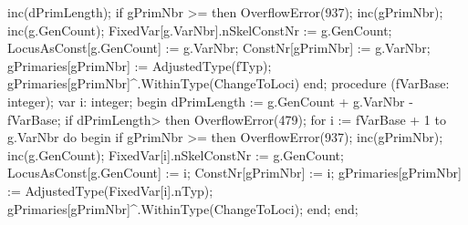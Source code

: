    inc(dPrimLength);
   if gPrimNbr >=  then OverflowError(937);
   inc(gPrimNbr);
   inc(g.GenCount);
   FixedVar[g.VarNbr].nSkelConstNr := g.GenCount;
   LocusAsConst[g.GenCount] := g.VarNbr;
   ConstNr[gPrimNbr] := g.VarNbr;
   gPrimaries[gPrimNbr] := AdjustedType(fTyp);
   gPrimaries[gPrimNbr]^.WithinType(ChangeToLoci)
end;
\eatline
{}\nwendcode{}\nwdocspar
\nwenddocs{}\endmoddef\nwstartdeflinemarkup{}\nwenddeflinemarkup
procedure (fVarBase: integer);
var
   i: integer;
begin
   dPrimLength := g.GenCount + g.VarNbr - fVarBase;
   if dPrimLength> then OverflowError(479);
   for i := fVarBase + 1 to g.VarNbr do
   begin
      if gPrimNbr >=  then OverflowError(937);
      inc(gPrimNbr);
      inc(g.GenCount);
      FixedVar[i].nSkelConstNr := g.GenCount;
      LocusAsConst[g.GenCount] := i;
      ConstNr[gPrimNbr] := i;
      gPrimaries[gPrimNbr] := AdjustedType(FixedVar[i].nTyp);
      gPrimaries[gPrimNbr]^.WithinType(ChangeToLoci);
   end;
end;
\eatline
{}\nwendcode{}\nwdocspar
